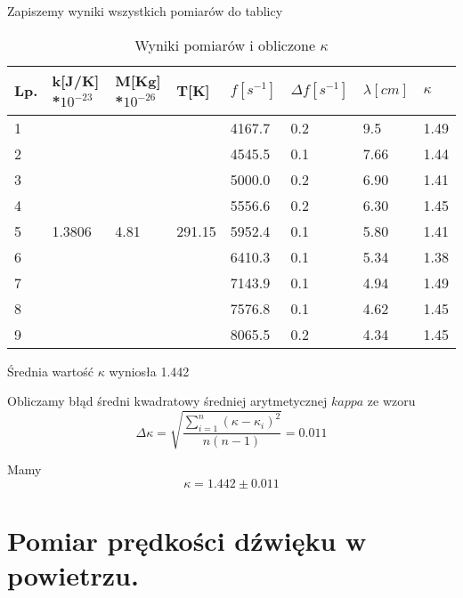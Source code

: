 \documentclass[12pt,a4paper]{article}
\begin{document}
Zapiszemy wyniki wszystkich pomiarów do tablicy

\begin{table}[H]
\centering

\label{my-label}
\begin{tabular}{|l|l|l|l|l|l|l|l|}
\hline
Lp. & k{[}J/K{]} *$10^{-23}$       & M{[}Kg{]} *$10^{-26}$      & T{[}K{]}                & $f[s^{-1}]$ & $\Delta f[s^{-1}]$ & $\lambda[cm]$ & $\kappa$ \\ \hline
1   & \multirow{9}{*}{1.3806} & \multirow{9}{*}{4.81} & \multirow{9}{*}{291.15} & 4167.7     & 0.2         & 9.5           & 1.49  \\ \cline{1-1} \cline{5-8} 
2   &                         &                       &                         & 4545.5     & 0.1         & 7.66           & 1.44  \\ \cline{1-1} \cline{5-8} 
3   &                         &                       &                         & 5000.0     & 0.2         & 6.90           & 1.41  \\ \cline{1-1} \cline{5-8} 
4   &                         &                       &                         & 5556.6     & 0.2         & 6.30           & 1.45  \\ \cline{1-1} \cline{5-8} 
5   &                         &                       &                         & 5952.4     & 0.1         & 5.80          & 1.41  \\ \cline{1-1} \cline{5-8} 
6   &                         &                       &                         & 6410.3     & 0.1         & 5.34          & 1.38  \\ \cline{1-1} \cline{5-8} 
7   &                         &                       &                         & 7143.9     & 0.1         & 4.94          & 1.49  \\ \cline{1-1} \cline{5-8} 
8   &                         &                       &                         & 7576.8     & 0.1         & 4.62           & 1.45  \\ \cline{1-1} \cline{5-8} 
9   &                         &                       &                         & 8065.5     & 0.2         & 4.34           & 1.45  \\ \hline
\end{tabular}
\caption{Wyniki pomiarów i obliczone $\kappa$}
\end{table}
Średnia wartość $\kappa$ wyniosła 1.442

Obliczamy błąd średni kwadratowy średniej arytmetycznej $kappa$ ze wzoru
$$
\Delta \kappa = \sqrt{\frac{\sum\limits_{i=1}^{n}{(\kappa-\kappa_i)^2}}{n(n-1)}} =  0.011
$$

Mamy 
$$
\kappa = 1.442 \pm 0.011
$$

\section{Pomiar prędkości dźwięku w powietrzu.}
\end{document}
